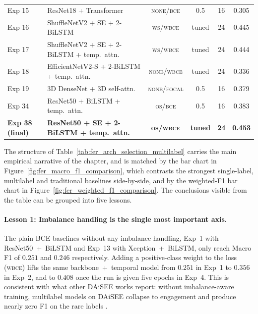 \begin{table}[H]
\begin{tabular}{lp{4.4cm}cccc}
Exp 15 & ResNet18 + Transformer                                    & \textsc{none}/\textsc{bce}    & 0.5     & 16 & 0.305 \\
Exp 16 & ShuffleNetV2 + SE + 2-BiLSTM                              & \textsc{ws}/\textsc{wbce}     & tuned   & 24 & 0.445 \\
Exp 17 & ShuffleNetV2 + SE + 2-BiLSTM + temp.\ attn.               & \textsc{ws}/\textsc{wbce}     & tuned   & 24 & 0.444 \\
Exp 18 & EfficientNetV2-S + 2-BiLSTM + temp.\ attn.                & \textsc{none}/\textsc{wbce}   & tuned   & 24 & 0.336 \\
Exp 19 & 3D DenseNet + 3D self-attn.                               & \textsc{none}/\textsc{focal}  & 0.5     & 16 & 0.379 \\
Exp 34 & ResNet50 + BiLSTM + temp.\ attn.                          & \textsc{os}/\textsc{bce}      & 0.5     & 16 & 0.383 \\
\textbf{Exp 38 (final)} & \textbf{ResNet50 + SE + 2-BiLSTM + temp.\ attn.} & \textbf{\textsc{os}/\textsc{wbce}} & \textbf{tuned} & \textbf{24} & \textbf{0.453} \\
\bottomrule
\end{tabular}
\end{table}

The structure of Table~\ref{tab:fer_arch_selection_multilabel} carries the main empirical narrative of the chapter, and is matched by the bar chart in Figure~\ref{fig:fer_macro_f1_comparison}, which contrasts the strongest single-label, multilabel and traditional baselines side-by-side, and by the weighted-F1 bar chart in Figure~\ref{fig:fer_weighted_f1_comparison}. The conclusions visible from the table can be grouped into five lessons.

\paragraph{Lesson 1: Imbalance handling is the single most important axis.} The plain BCE baselines without any imbalance handling, Exp~1 with ResNet50~+~BiLSTM and Exp~13 with Xception~+~BiLSTM, only reach Macro F1 of $0.251$ and $0.246$ respectively. Adding a positive-class weight to the loss (\textsc{wbce}) lifts the same backbone~+~temporal model from $0.251$ in Exp~1 to $0.356$ in Exp~2, and to $0.408$ once the run is given five epochs in Exp~4. This is consistent with what other DAiSEE works report: without imbalance-aware training, multilabel models on DAiSEE collapse to engagement and produce nearly zero F1 on the rare labels \cite{abedi_improving_2021,santoni_convolutional_2023,rianto_engagement_2025}.

